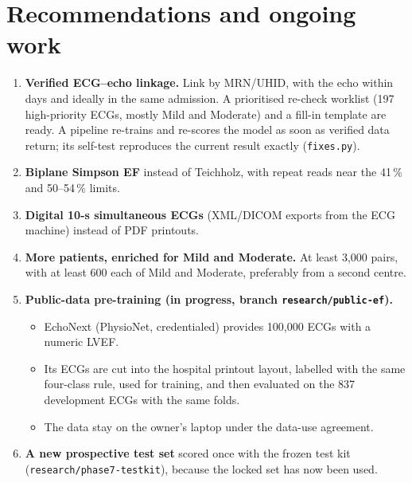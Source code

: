 \section{Recommendations and ongoing work}\label{sec:future}
\begin{enumerate}
  \item \textbf{Verified ECG--echo linkage.} Link by MRN/UHID, with the echo within days and ideally in the same
    admission. A prioritised re-check worklist (197 high-priority ECGs, mostly Mild and Moderate) and a fill-in
    template are ready. A pipeline re-trains and re-scores the model as soon as verified data return; its self-test
    reproduces the current result exactly (\texttt{fixes.py}).
  \item \textbf{Biplane Simpson EF} instead of Teichholz, with repeat reads near the 41\,\% and 50--54\,\% limits.
  \item \textbf{Digital 10-s simultaneous ECGs} (XML/DICOM exports from the ECG machine) instead of PDF printouts.
  \item \textbf{More patients, enriched for Mild and Moderate.} At least 3,000 pairs, with at least 600 each of Mild
    and Moderate, preferably from a second centre.
  \item \textbf{Public-data pre-training (in progress, branch \texttt{research/public-ef}).}
    \begin{itemize}
      \item EchoNext (PhysioNet, credentialed) provides 100,000 ECGs with a numeric LVEF.
      \item Its ECGs are cut into the hospital printout layout, labelled with the same four-class rule, used for
        training, and then evaluated on the 837 development ECGs with the same folds.
      \item The data stay on the owner's laptop under the data-use agreement.
    \end{itemize}
  \item \textbf{A new prospective test set} scored once with the frozen test kit (\texttt{research/phase7-testkit}),
    because the locked set has now been used.
\end{enumerate}
